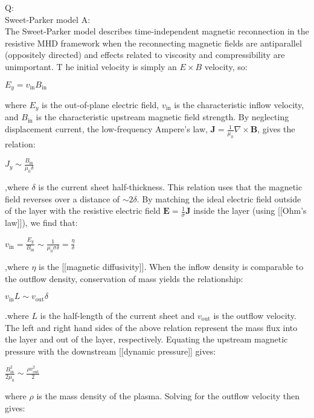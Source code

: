 \documentclass[12pt, a4paper, oneside]{article}
\begin{document}
\begin{spacing}{2.0}
Q:\\
Sweet-Parker model
A:\\
The Sweet-Parker model describes time-independent magnetic reconnection in the resistive MHD framework when the reconnecting magnetic 
fields are antiparallel (oppositely directed) and effects related to viscosity and compressibility are unimportant.  T
he initial velocity is simply an $E\times B$ velocity, so: 
\begin{center}
    $\displaystyle E_y = v_\text{in} B_\text{in}$
\end{center}
where $E_y$ is the out-of-plane electric field, $v_\text{in}$ is the characteristic inflow velocity, and $B_\text{in}$ is 
the characteristic upstream magnetic field strength.  By neglecting displacement current, the low-frequency Ampere's law, 
$\displaystyle\mathbf{J} = \frac{1}{\mu_0}\nabla\times\mathbf{B}$, gives the relation: 
\begin{center}
    $\displaystyle J_y \sim \frac{B_\text{in}}{\mu_0\delta}$
\end{center}
,where $\delta$ is the current sheet half-thickness.  This relation uses that the magnetic field reverses over a distance of 
$\sim2\delta$.  By matching the ideal electric field outside of the layer with the resistive electric field 
$\displaystyle\mathbf{E} = \frac{1}{\sigma}\mathbf{J}$ inside the layer (using [[Ohm's law]]), we find that: 
\begin{center}
    $\displaystyle v_\text{in} = \frac{E_y}{B_\text{in}} \sim \frac{1}{\mu_0\sigma\delta} = \frac{\eta}{\delta}$
\end{center}
,where $\eta$ is the [[magnetic diffusivity]].  When the inflow density is comparable to the outflow density, 
conservation of mass yields the relationship: 
\begin{center}
    $\displaystyle v_\text{in}L \sim v_\text{out}\delta$
\end{center}
.where $L$ is the half-length of the current sheet and $v_\text{out}$ is the outflow velocity.  
The left and right hand sides of the above relation represent the mass flux into the layer and out of the layer, respectively.  
Equating the upstream magnetic pressure with the downstream [[dynamic pressure]] gives: 
\begin{center}
    $\displaystyle \frac{B_\text{in}^2}{2\mu_0} \sim \frac{\rho v_\text{out}^2}{2}$
\end{center}
where $\rho$ is the mass density of the plasma.  Solving for the outflow velocity then gives: 
\begin{center}

\end{center}
\end{spacing}
\end{document}
